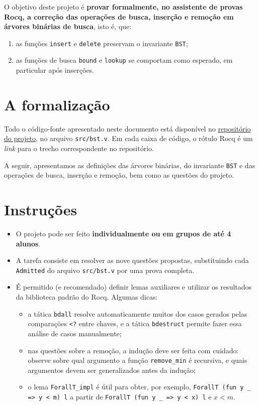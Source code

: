 \documentclass[11pt,a4paper]{article}
\newcommand{\rocq}{\textsf{Rocq}}
\begin{document}
\begin{objetivo}
  O objetivo deste projeto é \textbf{provar formalmente, no assistente de
    provas \rocq, a correção das operações de busca, inserção e remoção em
    árvores binárias de busca}, isto é, que:
  \begin{enumerate}[label=(\roman*),nosep]
  \item as funções \texttt{insert} e \texttt{delete} preservam o
    invariante \texttt{BST};
  \item as funções de busca \texttt{bound} e \texttt{lookup} se comportam
    como esperado, em particular após inserções.
  \end{enumerate}
\end{objetivo}

\section{A formalização}

Todo o código-fonte apresentado neste documento está disponível no
\href{https://github.com/flaviodemoura/bst-rocq}{repositório do projeto},
no arquivo \texttt{src/bst.v}. Em cada caixa de código, o rótulo \rocq{}
é um \emph{link} para o trecho correspondente no repositório.

A seguir, apresentamos as definições das árvores binárias, do invariante
\texttt{BST} e das operações de busca, inserção e remoção, bem como as
questões do projeto.



\section{Instruções}

\begin{itemize}[leftmargin=*]
\item O projeto pode ser feito \textbf{individualmente ou em grupos de até
    4 alunos}.
\item A tarefa consiste em resolver as nove questões propostas, substituindo
  cada \texttt{Admitted} do arquivo \texttt{src/bst.v} por uma prova completa.
\item É permitido (e recomendado) definir lemas auxiliares e utilizar os
  resultados da biblioteca padrão do \rocq. Algumas dicas:
  \begin{itemize}[nosep]
  \item a tática \texttt{bdall} resolve automaticamente muitos dos casos
    gerados pelas comparações \texttt{<?} entre chaves, e a tática
    \texttt{bdestruct} permite fazer essa análise de casos manualmente;
  \item nas questões sobre a remoção, a indução deve ser feita com cuidado:
    observe sobre qual argumento a função \texttt{remove\_min} é recursiva,
    e quais argumentos devem ser generalizados antes da indução;
  \item o lema \texttt{ForallT\_impl} é útil para obter, por exemplo,
    \texttt{ForallT (fun y \_ => y < m) l} a partir de
    \texttt{ForallT (fun y \_ => y < x) l} e $x < m$.
  \end{itemize}
\end{itemize}
\end{document}
